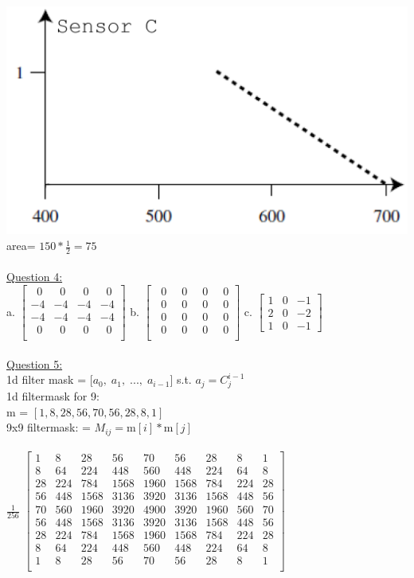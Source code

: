 \documentclass[12pt]{article}\usepackage{amsmath}
\begin{document}
\includegraphics[scale=1]{SensorC.png}
area= $150*\frac{1}{2} = 75$\\
\pagebreak\\
\underline{Question 4:}\\
a.
$\begin{bmatrix}
\;\; 0&\;\; 0&\;\; 0&\;\; 0\\
-4&-4&-4&-4\\
-4&-4&-4&-4\\
 \;\;0&\;\; 0&\;\; 0&\;\; 0\\
\end{bmatrix}$
b.
$\begin{bmatrix}
\;\; 0&\;\; 0&\;\; 0&\;\; 0\\
\;\; 0&\;\; 0&\;\; 0&\;\; 0\\
\;\; 0&\;\; 0&\;\; 0&\;\; 0\\
 \;\;0&\;\; 0&\;\; 0&\;\; 0\\
\end{bmatrix}$
c.
$\begin{bmatrix}
1 & 0 & -1\\
2 & 0 & -2\\
1 & 0 & -1
\end{bmatrix}$
\\\\
\underline{Question 5:}\\
1d filter mask = [$a_0,\; a_1,\; ...,\;a_{i-1}$] s.t. $a_j = C^{i-1}_j$\\
1d filtermask for 9:\\
m = $[ 1, 8, 28, 56, 70, 56, 28, 8, 1]$\\
9x9 filtermask: = $M_{ij} = $m$[i] * $m$[j]$\\\\
$\frac{1}{256}$
$\begin{bmatrix}
1&8&28&56&70&56&28&8&1\\
8&64&224&448&560&448&224&64&8\\
28&224&784&1568&1960&1568&784&224&28\\
56&448&1568&3136&3920&3136&1568&448&56\\
70&560&1960&3920&4900&3920&1960&560&70\\
56&448&1568&3136&3920&3136&1568&448&56\\
28&224&784&1568&1960&1568&784&224&28\\
8&64&224&448&560&448&224&64&8\\
1&8&28&56&70&56&28&8&1\\
\end{bmatrix}$
\end{document}
